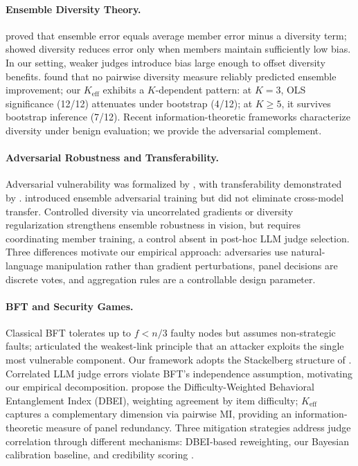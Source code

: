 \paragraph{Ensemble Diversity Theory.}
\citet{krogh1995neural} proved that ensemble error equals average member error minus a diversity term; \citet{brown2005managing} showed diversity reduces error only when members maintain sufficiently low bias. In our setting, weaker judges introduce bias large enough to offset diversity benefits. \citet{kuncheva2003measures} found that no pairwise diversity measure reliably predicted ensemble improvement; our $K_{\mathrm{eff}}$ exhibits a $K$-dependent pattern: at $K{=}3$, OLS significance (12/12) attenuates under bootstrap (4/12); at $K{\geq}5$, it survives bootstrap inference (7/12). Recent information-theoretic frameworks \citep{yang2026diversity,turkmen2026ensemble} characterize diversity under benign evaluation; we provide the adversarial complement.

\paragraph{Adversarial Robustness and Transferability.}
Adversarial vulnerability was formalized by \citet{goodfellow2015adversarial}, with transferability demonstrated by \citet{papernot2016transferability,papernot2017practical}. \citet{tramer2018ensemble} introduced ensemble adversarial training but did not eliminate cross-model transfer. Controlled diversity via uncorrelated gradients \citep{kariyappa2019improving} or diversity regularization \citep{pang2019improving} strengthens ensemble robustness in vision, but requires coordinating member training, a control absent in post-hoc LLM judge selection. Three differences motivate our empirical approach: adversaries use natural-language manipulation rather than gradient perturbations, panel decisions are discrete votes, and aggregation rules are a controllable design parameter.

\paragraph{BFT and Security Games.}
Classical BFT \citep{lamport1982byzantine,castro1999practical} tolerates up to $f < n/3$ faulty nodes but assumes non-strategic faults; \citet{schneier2000secrets} articulated the weakest-link principle that an attacker exploits the single most vulnerable component. Our framework adopts the Stackelberg structure of \citet{tambe2011security}. Correlated LLM judge errors \citep{kim2025correlated,kuai2026independent} violate BFT's independence assumption, motivating our empirical decomposition. \citet{kuai2026independent} propose the Difficulty-Weighted Behavioral Entanglement Index (DBEI), weighting agreement by item difficulty; $K_{\mathrm{eff}}$ captures a complementary dimension via pairwise MI, providing an information-theoretic measure of panel redundancy. Three mitigation strategies address judge correlation through different mechanisms: DBEI-based reweighting, our Bayesian calibration baseline, and credibility scoring \citep{ebrahimi2025adversary}.

